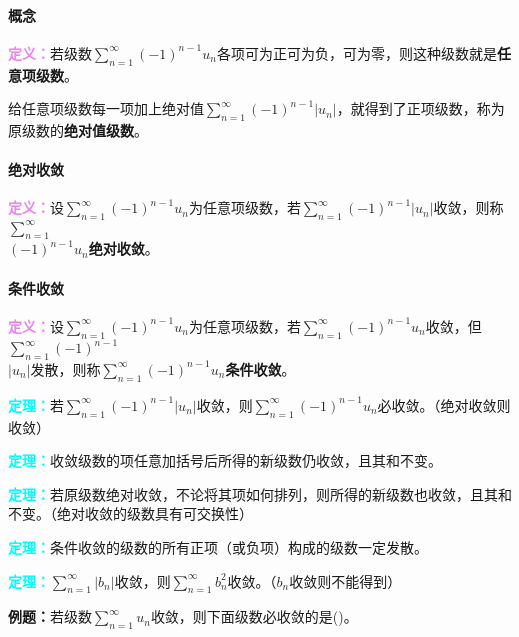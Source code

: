 \documentclass[UTF8, 12pt]{ctexart}
\begin{document}
\paragraph{概念} \leavevmode \medskip

\textcolor{violet}{\textbf{定义：}}若级数$\sum\limits_{n=1}^\infty(-1)^{n-1}u_n$各项可为正可为负，可为零，则这种级数就是\textbf{任意项级数}。

给任意项级数每一项加上绝对值$\sum\limits_{n=1}^\infty(-1)^{n-1}\vert u_n\vert$，就得到了正项级数，称为原级数的\textbf{绝对值级数}。

\paragraph{绝对收敛} \leavevmode \medskip

\textcolor{violet}{\textbf{定义：}}设$\sum\limits_{n=1}^\infty(-1)^{n-1}u_n$为任意项级数，若$\sum\limits_{n=1}^\infty(-1)^{n-1}\vert u_n\vert$收敛，则称$\sum\limits_{n=1}^\infty$\\$(-1)^{n-1}u_n$\textbf{绝对收敛}。

\paragraph{条件收敛} \leavevmode \medskip

\textcolor{violet}{\textbf{定义：}}设$\sum\limits_{n=1}^\infty(-1)^{n-1}u_n$为任意项级数，若$\sum\limits_{n=1}^\infty(-1)^{n-1}u_n$收敛，但$\sum\limits_{n=1}^\infty(-1)^{n-1}$\\$\vert u_n\vert$发散，则称$\sum\limits_{n=1}^\infty(-1)^{n-1}u_n$\textbf{条件收敛}。

\textcolor{aqua}{\textbf{定理：}}若$\sum\limits_{n=1}^\infty(-1)^{n-1}\vert u_n\vert$收敛，则$\sum\limits_{n=1}^\infty(-1)^{n-1}u_n$必收敛。（绝对收敛则收敛）

\textcolor{aqua}{\textbf{定理：}}收敛级数的项任意加括号后所得的新级数仍收敛，且其和不变。

\textcolor{aqua}{\textbf{定理：}}若原级数绝对收敛，不论将其项如何排列，则所得的新级数也收敛，且其和不变。（绝对收敛的级数具有可交换性）

\textcolor{aqua}{\textbf{定理：}}条件收敛的级数的所有正项（或负项）构成的级数一定发散。

\textcolor{aqua}{\textbf{定理：}}$\sum\limits_{n=1}^\infty\vert b_n\vert$收敛，则$\sum\limits_{n=1}^\infty b_n^2$收敛。（$b_n$收敛则不能得到）

\textbf{例题：}若级数$\sum\limits_{n=1}^\infty u_n$收敛，则下面级数必收敛的是()。
\end{document}
